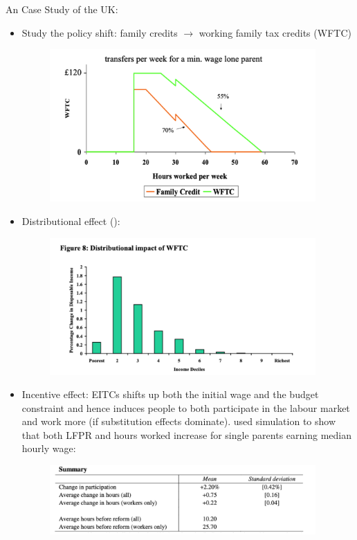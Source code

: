            An Case Study of the UK:
            \begin{itemize}
                \item Study the policy shift: family credits $\to$ working family tax credits (WFTC)
                    \begin{figure}[H]
                        \centering
                        \includegraphics[width=4in]{images/ch13/13_uk_casestudy_1.png}
                    \end{figure}
                \item Distributional effect (\cite{dilnot_family_1999}):
                    \begin{figure}[H]
                        \centering
                        \includegraphics[width=4in]{images/ch13/13_uk_casestudy_2.png}
                    \end{figure}
                \item Incentive effect: EITCs shifts up both the initial wage and the budget constraint and hence induces people to both participate in the labour market and work more (if substitution effects dominate). \cite{blundell_labour_2000} used simulation to show that both LFPR and hours worked increase for single parents earning median hourly wage:
                    \begin{figure}[H]
                        \centering
                        \includegraphics[width=4in]{images/ch13/13_uk_casestudy_3.png}
                    \end{figure}
            \end{itemize}

